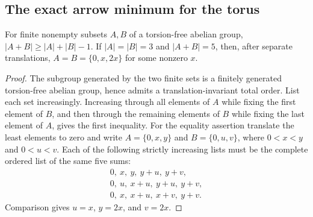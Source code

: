 \subsection{The exact arrow minimum for the torus}
\begin{lemma}\label{lem:C-small-sumset}
For finite nonempty subsets $A,B$ of a torsion-free abelian group,
$|A+B|\geq |A|+|B|-1$. If $|A|=|B|=3$ and $|A+B|=5$,
then, after separate translations, $A=B=\{0,x,2x\}$ for some
nonzero $x$.
\end{lemma}
\begin{proof}
The subgroup generated by the two finite sets is a finitely generated
torsion-free abelian group, hence admits a translation-invariant total
order. List each set increasingly. Increasing through all elements of
$A$ while fixing the first element of $B$, and then through the remaining
elements of $B$ while fixing the last element of $A$, gives the first
inequality. For the equality assertion translate the least elements to
zero and write $A=\{0,x,y\}$ and $B=\{0,u,v\}$, where
$0<x<y$ and $0<u<v$. Each of the following strictly increasing lists
must be the complete ordered list of the same five sums:
\[
\begin{gathered}
 0,\ x,\ y,\ y+u,\ y+v,\\
 0,\ u,\ x+u,\ y+u,\ y+v,\\
 0,\ x,\ x+u,\ x+v,\ y+v.
\end{gathered}
\]
Comparison gives $u=x$, $y=2x$, and $v=2x$.
\end{proof}

